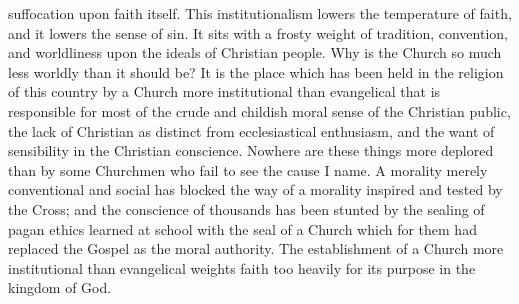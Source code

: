 \documentclass[12pt,a5paper,twoside]{book}
\begin{document}
suffocation upon faith itself. This institutionalism 
lowers the temperature of faith, and it lowers the 
sense of sin. It sits with a frosty weight of tradition, 
convention, and worldliness upon the ideals of Christian 
people. Why is the Church so much less 
worldly than it should be? It is the place which has 
been held in the religion of this country by a Church 
more institutional than evangelical that is responsible 
for most of the crude and childish moral sense of the 
Christian public, the lack of Christian as distinct 
from ecclesiastical enthusiasm, and the want of sensibility 
in the Christian conscience. Nowhere are these 
things more deplored than by some Churchmen who 
fail to see the cause I name. A morality merely conventional 
and social has blocked the way of a morality 
inspired and tested by the Cross; and the conscience 
of thousands has been stunted by the sealing of pagan 
ethics learned at school with the seal of a Church 
which for them had replaced the Gospel as the moral 
authority. The establishment of a Church more institutional 
than evangelical weights faith too heavily 
for its purpose in the kingdom of God. 
\end{document}
